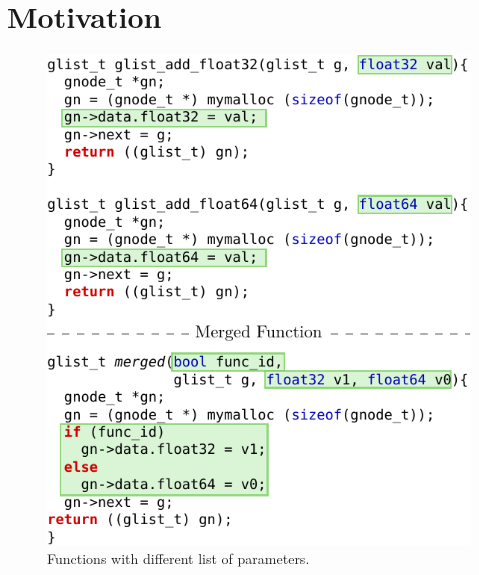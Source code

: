 \section{Motivation} \label{sec:motivation}


\begin{figure}[t!]
  \centering
  \includegraphics[width=.95\linewidth]{figs/sphinx-example.pdf}
  \caption{Functions with different list of parameters.}
  \label{fig:sphinx-example}
\end{figure}

